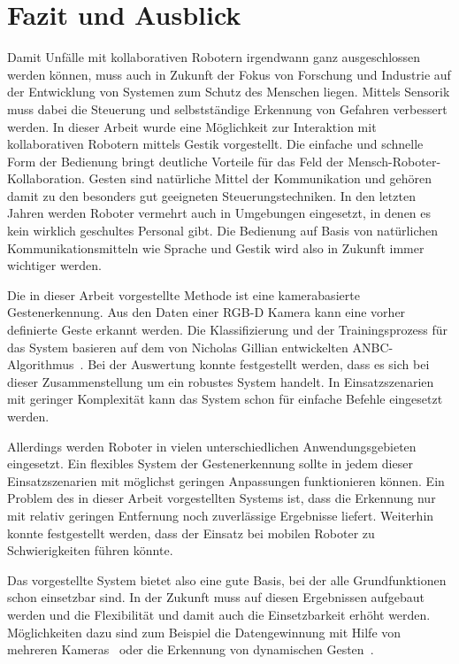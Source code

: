 \chapter{Fazit und Ausblick}
Damit Unfälle mit kollaborativen Robotern irgendwann ganz ausgeschlossen werden können, muss auch in Zukunft der Fokus von Forschung und Industrie auf der Entwicklung von Systemen zum Schutz des Menschen liegen. Mittels Sensorik muss dabei die Steuerung und selbstständige Erkennung von Gefahren verbessert werden. In dieser Arbeit wurde eine Möglichkeit zur Interaktion mit kollaborativen Robotern mittels Gestik vorgestellt. Die einfache und schnelle Form der Bedienung bringt deutliche Vorteile für das Feld der Mensch-Roboter-Kollaboration. Gesten sind natürliche Mittel der Kommunikation und gehören damit zu den besonders gut geeigneten Steuerungstechniken. In den letzten Jahren werden Roboter vermehrt auch in Umgebungen eingesetzt, in denen es kein wirklich geschultes Personal gibt. Die Bedienung auf Basis von natürlichen Kommunikationsmitteln wie Sprache und Gestik wird also in Zukunft immer wichtiger werden. 

Die in dieser Arbeit vorgestellte Methode ist eine kamerabasierte Gestenerkennung. Aus den Daten einer RGB-D Kamera kann eine vorher definierte Geste erkannt werden. Die Klassifizierung und der Trainingsprozess für das System basieren auf dem von Nicholas Gillian entwickelten ANBC-Algorithmus~\cite{gillianANBC}. Bei der Auswertung konnte festgestellt werden, dass es sich bei dieser Zusammenstellung um ein robustes System handelt. In Einsatzszenarien mit geringer Komplexität kann das System schon für einfache Befehle eingesetzt werden.

Allerdings werden Roboter in vielen unterschiedlichen Anwendungsgebieten eingesetzt. Ein flexibles System der Gestenerkennung sollte in jedem dieser Einsatzszenarien mit möglichst geringen Anpassungen funktionieren können. Ein Problem des in dieser Arbeit vorgestellten Systems ist, dass die Erkennung nur mit relativ geringen Entfernung noch zuverlässige Ergebnisse liefert. Weiterhin konnte festgestellt werden, dass der Einsatz bei mobilen Roboter zu Schwierigkeiten führen könnte.

Das vorgestellte System bietet also eine gute Basis, bei der alle Grundfunktionen schon einsetzbar sind. In der Zukunft muss auf diesen Ergebnissen aufgebaut werden und die Flexibilität und damit auch die Einsetzbarkeit erhöht werden. Möglichkeiten dazu sind zum Beispiel die Datengewinnung mit Hilfe von mehreren Kameras~\cite{multipleDepthCameras} oder die Erkennung von dynamischen Gesten~\cite{hiddenMarkov}. 

 